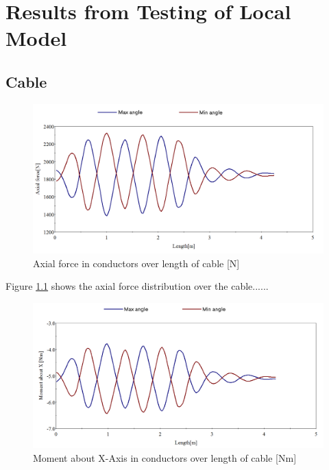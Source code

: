 \chapter{Results from Testing of Local Model}
\label{appendix:B}
\section{Cable}
\begin{figure}[H]
\centering
\includegraphics[scale=0.4]{figures/bflexax}
\caption[$\; \:$Axial force in conductors]{Axial force in conductors over length of cable [N]}
 \label{fig:bflexax}
\end{figure}
\noindent Figure \ref{fig:bflexax} shows the axial force distribution over the cable......
\begin{figure}[H]
\centering
\includegraphics[scale=0.4]{figures/bflexmx}
\caption[$\; \:$Moment about X-Axis in conductors]{Moment about X-Axis in conductors over length of cable  [Nm]}
 \label{fig:bflexmx}
\end{figure}


